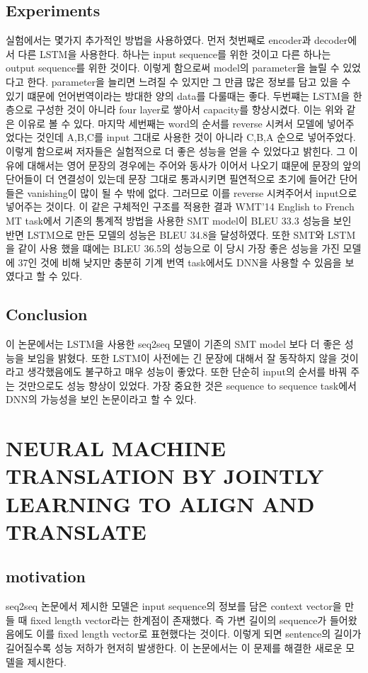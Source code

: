 \documentclass[extendedabs]{bmvc2k}
\begin{document}
 \subsection{Experiments}
 \quad 실험에서는 몇가지 추가적인 방법을 사용하였다. 먼저 첫번째로 encoder과 decoder에서 다른 LSTM을 사용한다. 하나는 input sequence를 위한 것이고 다른 하나는 output sequence를 위한 것이다.
 이렇게 함으로써 model의 parameter을 늘릴 수 있었다고 한다. parameter을 늘리면 느려질 수 있지만 그 만큼 많은 정보를 담고 있을 수 있기 떄문에 언어번역이라는 방대한 양의 data를 다룰때는 좋다.
 두번쨰는 LSTM을 한 층으로 구성한 것이 아니라 four layer로 쌓아서 capacity를 향상시켰다. 이는 위와 같은 이유로 볼 수 있다. 마지막 세번째는 word의 순서를 reverse 시켜서 모델에 넣어주었다는 것인데
 A,B,C를 input 그대로 사용한 것이 아니라 C,B,A 순으로 넣어주었다. 이렇게 함으로써 저자들은 실험적으로 더 좋은 성능을 얻을 수 있었다고 밝힌다. 
 그 이유에 대해서는 영어 문장의 경우에는 주어와 동사가 이어서 나오기 떄문에 문장의 앞의 단어들이 더 연결성이 있는데 문장 그대로 통과시키면 필연적으로 초기에 들어간 단어들은 vanishing이 많이 될 수 밖에 없다.
 그러므로 이를 reverse 시켜주어서 input으로 넣어주는 것이다. 이 같은 구체적인 구조를 적용한 결과 WMT'14 English to French MT task에서 기존의 통계적 방법을 사용한 SMT model이 BLEU 33.3 성능을 보인 반면 
 LSTM으로 만든 모델의 성능은 BLEU 34.8을 달성하였다. 또한 SMT와 LSTM을 같이 사용 했을 떄에는 BLEU 36.5의 성능으로 이 당시 가장 좋은 성능을 가진 모델에 37인 것에 비해 낮지만 충분히 
 기계 번역 task에서도 DNN을 사용할 수 있음을 보였다고 할 수 있다.
 \subsection{Conclusion}
 \quad 이 논문에서는 LSTM을 사용한 seq2seq 모델이 기존의 SMT model 보다 더 좋은 성능을 보임을 밝혔다. 또한 LSTM이 사전에는 긴 문장에 대해서 잘 동작하지 않을 것이라고 생각했음에도 불구하고 매우 성능이 좋았다.
  또한 단순히 input의 순서를 바꿔 주는 것만으로도 성능 향상이 있었다. 가장 중요한 것은 sequence to sequence task에서 DNN의 가능성을 보인 논문이라고 할 수 있다.

 \section{NEURAL MACHINE TRANSLATION BY JOINTLY LEARNING TO ALIGN AND TRANSLATE\cite{bahdanau2014neural}}
 
 \subsection{motivation}
 \quad seq2seq 논문에서 제시한 모델은 input sequence의 정보를 담은 context vector을 만들 때 fixed length vector라는 한계점이 존재했다. 
 즉 가변 길이의 sequence가 들어왔음에도 이를 fixed length vector로 표현했다는 것이다. 이렇게 되면 sentence의 길이가
 길어질수록 성능 저하가 현저히 발생한다. 이 논문에서는 이 문제를 해결한 새로운 모델을 제시한다.
 
\end{document}
